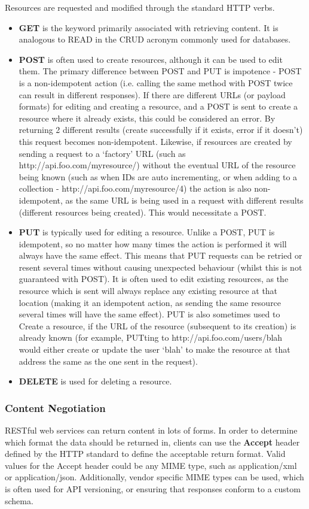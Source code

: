 \documentclass{article}
\begin{document}
Resources are requested and modified through the standard HTTP verbs.
\begin{itemize}
    \item \textbf{GET} is the keyword primarily associated with retrieving content. It is analogous to READ in the CRUD acronym commonly used for databases.
    \item \textbf{POST} is often used to create resources, although it can be used to edit them. The primary difference between POST and PUT is impotence - POST is a non-idempotent action (i.e. calling the same method with POST twice can result in different responses). If there are different URLs (or payload formats) for editing and creating a resource, and a POST is sent to create a resource where it already exists, this could be considered an error. By returning 2 different results (create successfully if it exists, error if it doesn't) this request becomes non-idempotent. Likewise, if resources are created by sending a request to a `factory' URL (such as http://api.foo.com/myresource/) without the eventual URL of the resource being known (such as when IDs are auto incrementing, or when adding to a collection - http://api.foo.com/myresource/4) the action is also non-idempotent, as the same URL is being used in a request with different results (different resources being created). This would necessitate a POST. 
    \item \textbf{PUT} is typically used for editing a resource. Unlike a POST, PUT is idempotent, so no matter how many times the action is performed it will always have the same effect. This means that PUT requests can be retried or resent several times without causing unexpected behaviour (whilst this is not guaranteed with POST). It is often used to edit existing resources, as the resource which is sent will always replace any existing resource at that location (making it an idempotent action, as sending the same resource several times will have the same effect). PUT is also sometimes used to Create a resource, if the URL of the resource (subsequent to its creation) is already known (for example, PUTting to http://api.foo.com/users/blah would either create or update the user `blah' to make the resource at that address the same as the one sent in the request).
    \item \textbf{DELETE} is used for deleting a resource.
\end{itemize}

\subsubsection{Content Negotiation}
RESTful web services can return content in lots of forms. In order to determine which format the data should be returned in, clients can use the \textbf{Accept} header defined by the HTTP standard to define the acceptable return format. Valid values for the Accept header could be any MIME type, such as application/xml or application/json. Additionally, vendor specific MIME types can be used, which is often used for API versioning, or ensuring that responses conform to a custom schema.
\end{document}

